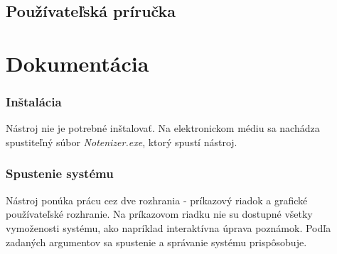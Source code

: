 \newpage
{}
{
	\section{Používateľská príručka}
}
{
	\chapter{Dokumentácia}
}

\subsection{Inštalácia}
Nástroj nie je potrebné inštalovať. Na elektronickom médiu sa nachádza spustiteľný súbor \textit{Notenizer.exe}, ktorý spustí nástroj. 

\subsection{Spustenie systému}
Nástroj ponúka prácu cez dve rozhrania - príkazový riadok a grafické používateľské rozhranie. Na príkazovom riadku nie su dostupné všetky vymoženosti systému, ako napríklad interaktívna úprava poznámok. Podľa zadaných argumentov sa spustenie a správanie systému prispôsobuje.

